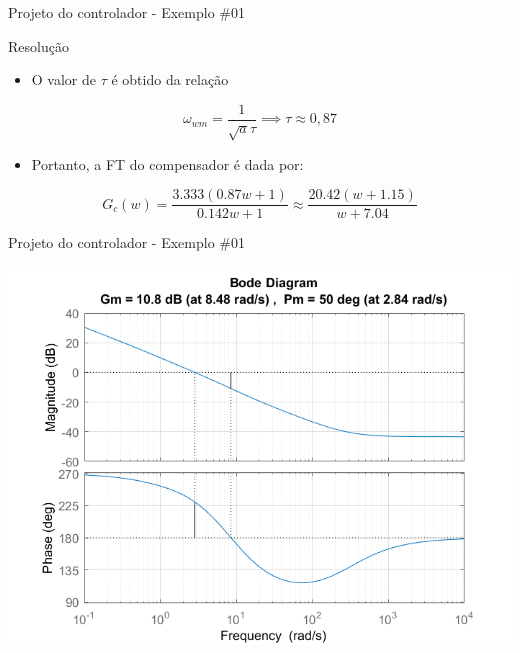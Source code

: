 \begin{frame}{Projeto do controlador - Exemplo \#01}
\begin{block}{Resolução}
\begin{itemize}
    \item O valor de $\tau$ é obtido da relação 
\end{itemize}
\begin{equation*}
    \omega_{wm} = \frac{1}{\sqrt{a}\tau} \implies \tau \approx 0,87
\end{equation*}
\begin{itemize}
    \item Portanto, a FT do compensador é dada por:
\end{itemize}
\begin{equation*}
    G_c(w) = \dfrac{\num{3,333}(\num{0,87}w + 1)}{\num{0,142}w + 1} \approx \dfrac{\num{20,42}(w + \num{1,15})}{w + \num{7,04}}
\end{equation*}
\end{block}
\end{frame}

\begin{frame}{Projeto do controlador - Exemplo \#01}
\centerline{\includegraphics[width=0.8\linewidth]{Figuras/Ch13/fig12.png}}
\end{frame}

